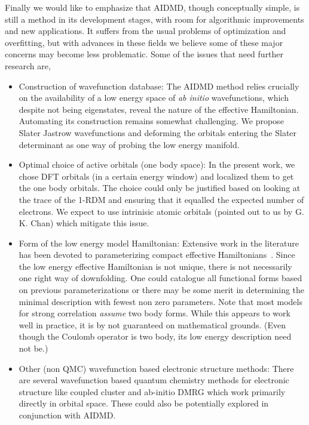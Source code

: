 \documentclass[prl,12pt,onecolumn,nofootinbib,notitlepage,english,superscriptaddress]{revtex4-1}
\begin{document}
Finally we would like to emphasize that AIDMD, though conceptually simple, 
is still a method in its development stages, with room for algorithmic improvements and new applications. It suffers 
from the usual problems of optimization and overfitting, but with advances in these fields we believe some of these major 
concerns may become less problematic. Some of the issues that need further research are,
\begin{itemize} 
	\item Construction of wavefunction database:
	The AIDMD method relies crucially on the availability of a low energy space of \emph{ab initio} wavefunctions, 
	which despite not being eigenstates, reveal the nature of the effective Hamiltonian. Automating its construction 
	remains somewhat challenging. We propose Slater Jastrow wavefunctions and deforming the orbitals entering the Slater 
	determinant as one way of probing the low energy manifold.
	\item Optimal choice of active orbitals (one body space):
	In the present work, we chose DFT orbitals (in a certain energy window) and localized them to get the one body orbitals. 
	The choice could only be justified based on looking at the trace of the 1-RDM and ensuring that it 
	equalled the expected number of electrons. We expect to use intrinisic atomic orbitals (pointed out to us by G. K. Chan) which 
	mitigate this issue. 
	\item Form of the low energy model Hamiltonian:
	Extensive work in the literature has been devoted to parameterizing compact effective Hamiltonians~\cite{Georges, Oles, Coury}. 
	Since the low energy effective Hamiltonian is not unique, there is not necessarily one right way of downfolding. 
	One could catalogue all functional forms based on previous parameterizations 
	or there may be some merit in determining the minimal description with fewest non zero parameters.
	Note that most models for strong correlation \emph{assume} two body forms. While this appears to work well in practice, 
	it is by not guaranteed on mathematical grounds. (Even though the Coulomb operator is two body, 
	its low energy description need not be.)
	\item Other (non QMC) wavefunction based electronic structure methods:
	There are several wavefunction based quantum chemistry 
	methods for electronic structure like coupled cluster and ab-initio DMRG which work primarily 
	directly in orbital space. These could also be potentially explored in conjunction with AIDMD.
	
\end{itemize} 
\end{document}
